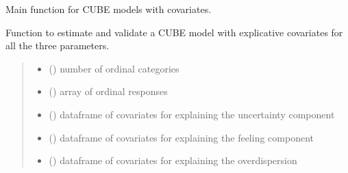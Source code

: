 \documentclass[letterpaper,10pt,english]{sphinxmanual}
\begin{document}
\begin{fulllineitems}
\label{\detokenize{cubmods:cubmods.cube_ywz.mle}}
\pysigstartsignatures
{}
\pysigstopsignatures
\sphinxAtStartPar
Main function for CUBE models with covariates.

\sphinxAtStartPar
Function to estimate and validate a CUBE model with 
explicative covariates for all the three parameters.
\begin{quote}\begin{description}
\begin{itemize}
\item {} 
\sphinxAtStartPar
{} () \textendash{} number of ordinal categories

\item {} 
\sphinxAtStartPar
{} () \textendash{} array of ordinal responses

\item {} 
\sphinxAtStartPar
{} () \textendash{} dataframe of covariates for explaining the uncertainty component

\item {} 
\sphinxAtStartPar
{} () \textendash{} dataframe of covariates for explaining the feeling component

\item {} 
\sphinxAtStartPar
{} () \textendash{} dataframe of covariates for explaining the overdispersion


\end{itemize}
\end{description}
\end{quote}
\end{fulllineitems}
\end{document}
